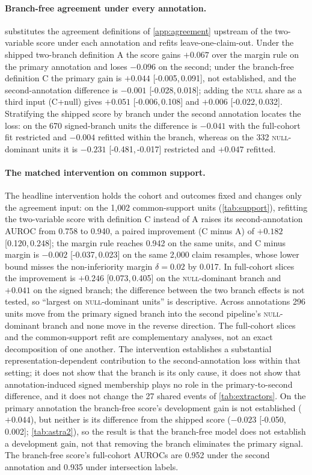 \documentclass[11pt]{article}
\newcommand{\ci}[2]{[#1,\,#2]}
\begin{document}
\paragraph{Branch-free agreement under every annotation.}  substitutes the
agreement definitions of \cref{app:agreement} upstream of the two-variable score under each
annotation and refits leave-one-claim-out. Under the shipped two-branch definition A the score
gains $+0.067$ over the margin rule on the primary annotation and loses $-0.096$ on the second;
under the branch-free definition C the primary gain is $+0.044$ \ci{-0.005}{0.091}, not
established, and the second-annotation difference is $-0.001$ \ci{-0.028}{0.018}; adding the
\textsc{null} share as a third input (C+null) gives $+0.051$ \ci{-0.006}{0.108} and $+0.006$
\ci{-0.022}{0.032}. Stratifying the shipped score by branch under the second annotation locates the
loss: on the 670 signed-branch units the difference is $-0.041$ with the full-cohort fit
restricted and $-0.004$ refitted within the branch, whereas on the 332 \textsc{null}-dominant units it
is $-0.231$ \ci{-0.481}{-0.017} restricted and $+0.047$ refitted.

\paragraph{The matched intervention on common support.} The headline intervention holds the cohort
and outcomes fixed and changes only the agreement input: on the 1{,}002 common-support units
(\cref{tab:support}), refitting the two-variable score with definition C instead of A raises its
second-annotation AUROC from 0.758 to 0.940, a paired improvement (C minus A) of $+0.182$
\ci{0.120}{0.248}; the margin rule reaches 0.942 on the same units, and C minus margin is
$-0.002$ \ci{-0.037}{0.023} on the same 2{,}000 claim resamples, whose lower bound misses the
non-inferiority margin $\delta=0.02$ by 0.017. In
full-cohort slices the improvement is $+0.246$ \ci{0.073}{0.405} on the \textsc{null}-dominant
branch and $+0.041$ on the signed branch; the difference between the two branch effects is not
tested, so ``largest on \textsc{null}-dominant units'' is descriptive. Across annotations 296
units move from the primary signed branch into the second pipeline's \textsc{null}-dominant branch
and none move in the reverse direction. The full-cohort slices and the common-support refit are
complementary analyses, not an exact decomposition of one another. The intervention establishes a
substantial representation-dependent contribution to the second-annotation loss within that
setting; it does not show that the branch is its only cause, it does not show that
annotation-induced signed membership plays no role in the primary-to-second difference, and it
does not change the 27 shared events of \cref{tab:extractors}. On the primary annotation the
branch-free score's development gain is not established ($+0.044$), but neither is its
difference from the shipped score ($-0.023$ \ci{-0.050}{0.002}; \cref{tab:astra2}), so the
result is that the branch-free model does not establish a development gain, not that removing the
branch eliminates the primary signal. The branch-free score's full-cohort AUROCs are 0.952
under the second annotation and 0.935 under intersection labels.
\end{document}
